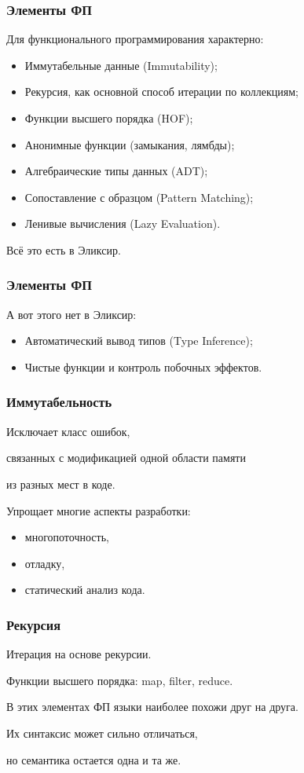 \documentclass[10pt]{beamer}
\begin{document}
\begin{frame}
  \frametitle{Элементы ФП}
  Для функционального программирования характерно:
  \par \bigskip
  \begin{itemize}
  \item Иммутабельные данные (Immutability);
  \item Рекурсия, как основной способ итерации по коллекциям;
  \item Функции высшего порядка (HOF);
  \item Анонимные функции (замыкания, лямбды);
  \item Алгебраические типы данных (ADT);
  \item Сопоставление с образцом (Pattern Matching);
  \item Ленивые вычисления (Lazy Evaluation).
  \end{itemize}
  \par \bigskip
  Всё это есть в Эликсир.
\end{frame}

\begin{frame}
  \frametitle{Элементы ФП}
  А вот этого нет в Эликсир:
  \par \bigskip
  \begin{itemize}
  \item Автоматический вывод типов (Type Inference);
  \item Чистые функции и контроль побочных эффектов.
  \end{itemize}
\end{frame}

\begin{frame}
  \frametitle{Иммутабельность}
  Исключает класс ошибок,
  \par \bigskip
  связанных с модификацией одной области памяти
  \par \bigskip
  из разных мест в коде.
  \par \bigskip
  Упрощает многие аспекты разработки:
  \par \bigskip
  \begin{itemize}
  \item многопоточность,
  \item отладку,
  \item статический анализ кода.
  \end{itemize}
\end{frame}

\begin{frame}
  \frametitle{Рекурсия}
  Итерация на основе рекурсии.
  \par \bigskip
  Функции высшего порядка: map, filter, reduce.
  \par \bigskip
  В этих элементах ФП языки наиболее похожи друг на друга.
  \par \bigskip
  Их синтаксис может сильно отличаться,
  \par \bigskip
  но семантика остается одна и та же.
\end{frame}
\end{document}
